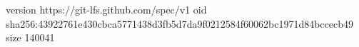 version https://git-lfs.github.com/spec/v1
oid sha256:43922761e430cbca5771438d3fb5d7da9f0212584f60062bc1971d84bccecb49
size 140041
